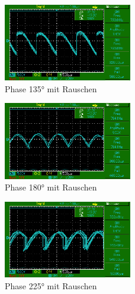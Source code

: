 \begin{figure}
    \centering
    \includegraphics[width=0.5\textwidth]{bilder/MAP010.png}
    \caption{Phase 135° mit Rauschen}        
    \label{fig:MAP010}
\end{figure}

\begin{figure}
    \centering
    \includegraphics[width=0.5\textwidth]{bilder/MAP011.png}
    \caption{Phase 180° mit Rauschen}        
    \label{fig:MAP011}
\end{figure}

\begin{figure}
    \centering
    \includegraphics[width=0.5\textwidth]{bilder/MAP012.png}
    \caption{Phase 225° mit Rauschen}        
    \label{fig:MAP012}
\end{figure}
